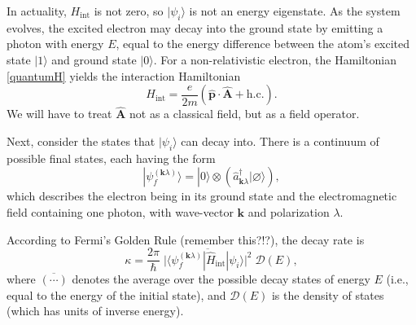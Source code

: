 \documentclass[pra,12pt]{revtex4}
\begin{document}
In actuality, $H_{\mathrm{int}}$ is not zero, so $|\psi_i\rangle$ is
not an energy eigenstate.  As the system evolves, the excited electron
may decay into the ground state by emitting a photon with energy $E$,
equal to the energy difference between the atom's excited state
$|1\rangle$ and ground state $|0\rangle$.  For a non-relativistic
electron, the Hamiltonian \eqref{quantumH} yields the interaction
Hamiltonian
\begin{equation}
  H_{\mathrm{int}} = \frac{e}{2m} \left( \hat{\mathbf{p}} \cdot \hat{\mathbf{A}} + \mathrm{h.c.}\right).
\end{equation}
We will have to treat $\hat{\mathbf{A}}$ not as a classical field, but
as a field operator.

Next, consider the states that $|\psi_i\rangle$ can decay into.  There
is a continuum of possible final states, each having the form
\begin{equation}
  | \psi_{f}^{(\mathbf{k}\lambda)} \rangle = |0\rangle \otimes
  \left( \hat{a}_{\mathbf{k}\lambda}^\dagger |\varnothing\rangle\right),
  \label{decaystate}
\end{equation}
which describes the electron being in its ground state and the
electromagnetic field containing one photon, with wave-vector
$\mathbf{k}$ and polarization $\lambda$.

According to Fermi's Golden Rule (remember this?!?), the decay rate is
\begin{equation}
  \kappa = \frac{2\pi}{\hbar} \;
  \overline{\Big| \langle \psi_{f}^{(\mathbf{k}\lambda)} | \hat{H}_{\mathrm{int}}|\psi_i\rangle\Big|^2} \;
  \mathcal{D}(E),
\end{equation}
where $\overline{(\cdots)}$ denotes the average over the possible
decay states of energy $E$ (i.e., equal to the energy of the initial
state), and $\mathcal{D}(E)$ is the density of states (which has units
of inverse energy).
\end{document}
